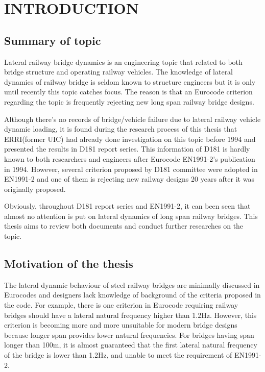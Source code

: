 

\chapter{INTRODUCTION}

\section{Summary of topic}


Lateral railway bridge dynamics is an engineering topic that related to both bridge structure and operating railway vehicles. The knowledge of lateral dynamics of railway bridge is seldom known to structure engineers but it is only until recently this topic catches focus. The reason is that an Eurocode criterion regarding the topic is frequently rejecting new long span railway bridge designs. 

Although there's no records of bridge/vehicle failure due to lateral railway vehicle dynamic loading, it is found during the research process of this thesis that ERRI(former UIC) had already done investigation on this topic before 1994 and presented the results in D181 report series. This information of D181 is hardly known to both researchers and engineers after Eurocode EN1991-2's publication in 1994. However, several criterion proposed by D181 committee were adopted in EN1991-2 and one of them is rejecting new railway designs 20 years after it was originally proposed. 

Obviously, throughout D181 report series and EN1991-2, it can been seen that almost no attention is put on lateral dynamics of long span railway bridges. This thesis aims to review both documents and conduct further researches on the topic.

\section{Motivation of the thesis}

The lateral dynamic behaviour of steel railway bridges are minimally discussed in Eurocodes and designers lack knowledge of background of the criteria proposed in the code. For example, there is one criterion in Eurocode requiring railway bridges should have a lateral natural frequency higher than 1.2Hz. However, this criterion is becoming more and more unsuitable for modern bridge designs because longer span provides lower natural frequencies. For bridges having span longer than 100m, it is almost guaranteed that the first lateral natural frequency of the bridge is lower than 1.2Hz, and unable to meet the requirement of EN1991-2. 


